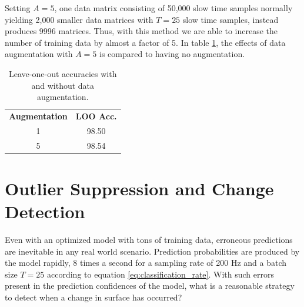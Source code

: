 Setting $A=5$, one data matrix consisting of 50,000 slow time samples normally yielding 2,000 smaller data matrices with $T=25$ slow time samples, instead produces 9996 matrices. Thus, with this method we are able to increase the number of training data by almost a factor of 5. In table \ref{tab:aug}, the effects of data augmentation with $A=5$ is compared to having no augmentation.


\begin{table}
	\label{tab:aug}
	\begin{center}
		\begin{tabular}{|c|c|}
			\hline
			\rowcolor{gray!150}
			\color{white}\textbf{Augmentation} & \color{white}\textbf{LOO Acc.} \\
			1 & 98.50 \\
			5 & 98.54 \\
			\hline
		\end{tabular}
	\end{center}
	\caption{Leave-one-out accuracies with and without data augmentation.}
\end{table}



\section{Outlier Suppression and Change Detection}

\label{surface_change}
Even with an optimized model with tons of training data, erroneous predictions are inevitable in any real world scenario. Prediction probabilities are produced by the model rapidly, 8 times a second for a sampling rate of 200 Hz and a batch size $T=25$ according to equation \ref{eq:classification_rate}. With such errors present in the prediction confidences of the model, what is a reasonable strategy to detect when a change in surface has occurred?  

